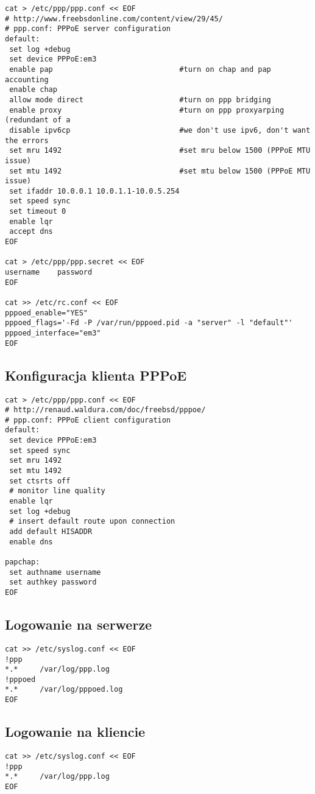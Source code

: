 \documentclass[a4paper,11pt]{article}
\begin{document}
\begin{verbatim}
cat > /etc/ppp/ppp.conf << EOF
# http://www.freebsdonline.com/content/view/29/45/
# ppp.conf: PPPoE server configuration
default:
 set log +debug
 set device PPPoE:em3
 enable pap                             #turn on chap and pap accounting
 enable chap
 allow mode direct                      #turn on ppp bridging
 enable proxy                           #turn on ppp proxyarping (redundant of a
 disable ipv6cp                         #we don't use ipv6, don't want the errors
 set mru 1492                           #set mru below 1500 (PPPoE MTU issue)
 set mtu 1492                           #set mtu below 1500 (PPPoE MTU issue)
 set ifaddr 10.0.0.1 10.0.1.1-10.0.5.254
 set speed sync
 set timeout 0
 enable lqr
 accept dns
EOF

cat > /etc/ppp/ppp.secret << EOF
username	password
EOF

cat >> /etc/rc.conf << EOF
pppoed_enable="YES"
pppoed_flags='-Fd -P /var/run/pppoed.pid -a "server" -l "default"'
pppoed_interface="em3"
EOF
\end{verbatim}



\subsection*{Konfiguracja klienta PPPoE}
\begin{verbatim}
cat > /etc/ppp/ppp.conf << EOF
# http://renaud.waldura.com/doc/freebsd/pppoe/
# ppp.conf: PPPoE client configuration
default:
 set device PPPoE:em3
 set speed sync
 set mru 1492 
 set mtu 1492
 set ctsrts off
 # monitor line quality 
 enable lqr
 set log +debug
 # insert default route upon connection
 add default HISADDR
 enable dns

papchap:
 set authname username
 set authkey password
EOF
\end{verbatim}

\subsection*{Logowanie na serwerze}
\begin{verbatim}
cat >> /etc/syslog.conf << EOF
!ppp
*.*		/var/log/ppp.log
!pppoed
*.*		/var/log/pppoed.log
EOF
\end{verbatim}

\subsection*{Logowanie na kliencie}
\begin{verbatim}
cat >> /etc/syslog.conf << EOF
!ppp
*.*		/var/log/ppp.log
EOF
\end{verbatim}
\end{document}

